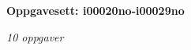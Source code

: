 \centerline{\bf Oppgavesett: i00020no-i00029no}
\vskip 10pt
\centerline{\it 10 oppgaver}\vskip 10pt
\vskip 10pt
